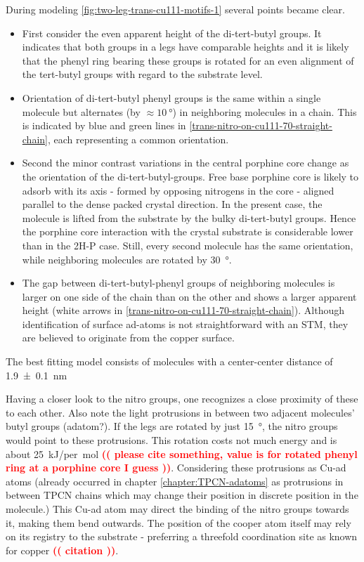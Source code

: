 	During modeling \autoref{fig:two-leg-trans-cu111-motifs-1} several points became clear. 
	\begin{itemize}
		\item First consider the even apparent height of the di-tert-butyl groups. It indicates that both groups in a legs have comparable heights and it is likely that the phenyl ring bearing these groups is rotated for an even alignment of the tert-butyl groups with regard to the substrate level.
		\item Orientation of di-tert-butyl phenyl groups is the same within a single molecule but alternates (by $\approx \SI{10}{\degree}$) in neighboring molecules in a chain. This is indicated by blue and green lines in \autoref{trans-nitro-on-cu111-70-straight-chain}, each representing a common orientation.
		\item Second the minor contrast variations in the central porphine core change as the orientation of the di-tert-butyl-groups. Free base porphine core is likely to adsorb with its axis  - formed by opposing nitrogens in the core - aligned parallel to the dense packed crystal direction\cite{rojas_surface_2012}. In the present case, the molecule is lifted from the substrate by the bulky di-tert-butyl groups. Hence the porphine core interaction with the crystal substrate is considerable lower than in the 2H-P case. Still, every second molecule has the same orientation, while neighboring molecules are rotated by \SI{30}{\degree}.
		\item The gap between di-tert-butyl-phenyl groups of neighboring molecules is larger on one side of the chain than on the other and shows a larger apparent height (white arrows in \autoref{trans-nitro-on-cu111-70-straight-chain}). Although identification of surface ad-atoms is not straightforward with an STM, they are believed to originate from the copper surface.
	\end{itemize} 
	The best fitting model consists of molecules with a center-center distance of \SI{1.9 \pm 0.1}{\nano \meter}
	
	Having a closer look to the nitro groups, one recognizes a close proximity of these to each other. Also note the light protrusions in between two adjacent molecules' butyl groups (adatom?). If the legs are rotated by just \SI{15}{\degree}, the nitro groups would point to these protrusions. This rotation costs not much energy and is about \SI{25}{\kilo\J/per\mol} \textcolor{red}{\textbf{(( please cite something, value is for rotated phenyl ring at a porphine core I guess ))}}. Considering these protrusions as Cu-ad atoms (already occurred in chapter \ref{chapter:TPCN-adatoms} as protrusions in between TPCN chains which may change their position in discrete position in the molecule.) This Cu-ad atom may direct the binding of the nitro groups towards it, making them bend outwards. The position of the cooper atom itself may rely on its registry to the substrate - preferring a threefold coordination site as known for copper  \textcolor{red}{\textbf{(( citation ))}}.
	
